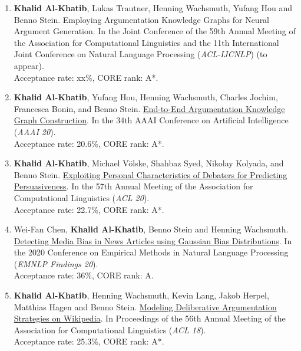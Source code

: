 
\begin{enumerate}
\item {\textbf{Khalid Al-Khatib}, Lukas Trautner, Henning Wachsmuth, Yufang Hou and Benno Stein. Employing Argumentation Knowledge Graphs for Neural Argument Generation. In the Joint Conference of the 59th Annual Meeting of the Association for Computational Linguistics and the 11th International Joint Conference on Natural Language Processing (\textit{ACL-IJCNLP}) (to appear).} \\
Acceptance rate: xx\%, CORE rank: A*.
\item {\textbf{Khalid Al-Khatib}, Yufang Hou, Henning Wachsmuth, Charles Jochim, Francesca Bonin, and Benno Stein.  \href{https://ojs.aaai.org//index.php/AAAI/article/view/6231}{End-to-End Argumentation Knowledge Graph Construction}. In the 34th AAAI Conference on Artificial Intelligence (\textit{AAAI 20}).\\ Acceptance rate: 20.6\%, CORE rank: A*.}
\item {\textbf{Khalid Al-Khatib}, Michael Völske, Shahbaz Syed, Nikolay Kolyada, and Benno Stein. \href{https://www.aclweb.org/anthology/2020.acl-main.632/}{Exploiting Personal Characteristics of Debaters for Predicting Persuasiveness}. In the 57th Annual Meeting of the Association for Computational Linguistics (\textit{ACL 20}).\\
Acceptance rate: 22.7\%, CORE rank: A*. }
\item {Wei-Fan Chen, \textbf{Khalid Al-Khatib}, Benno Stein and Henning Wachsmuth.  \href{https://www.aclweb.org/anthology/2020.findings-emnlp.383/} {Detecting Media Bias in News Articles using Gaussian Bias Distributions}. In the 2020 Conference on Empirical Methods in Natural Language Processing (\textit{EMNLP Findings 20}).\\
Acceptance rate: 36\%, CORE rank: A. 
}
\item {\textbf{Khalid Al-Khatib}, Henning Wachsmuth, Kevin Lang, Jakob Herpel, Matthias Hagen and Benno Stein. \href{https://www.aclweb.org/anthology/P18-1237/}{Modeling Deliberative Argumentation Strategies on Wikipedia}. In Proceedings of the 56th Annual Meeting of the Association for Computational Linguistics (\textit{ACL 18}). \\
Acceptance rate: 25.3\%, CORE rank: A*. }
\end{enumerate}
